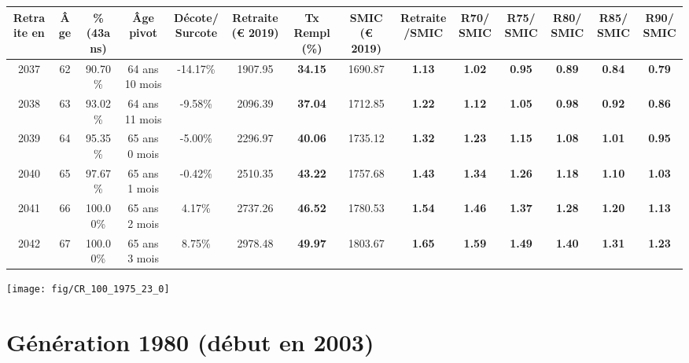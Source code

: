 \begin{adjustbox}{max width=\textwidth} 
\begin{tabular}[htb]{|c|c||c|c|c||c|c||c|c||c|c|c|c|c|} 
\hline 
 Retraite en &  Âge &  \%(43ans) &  Âge pivot &  Décote/Surcote &  Retraite (\euro{} 2019) &  Tx Rempl(\%) &  SMIC (\euro{} 2019) &  Retraite/SMIC &  R70/SMIC &  R75/SMIC &  R80/SMIC &  R85/SMIC &  R90/SMIC \\ 
\hline \hline 
 2037 &  62 &  90.70\% &  64 ans 10 mois &  -14.17\% &  1907.95 &  {\bf 34.15} &  1690.87 &  {\bf 1.13} &  {\bf 1.02} &  {\bf {\color{red} 0.95}} &  {\bf {\color{red} 0.89}} &  {\bf {\color{red} 0.84}} &  {\bf {\color{red} 0.79}} \\ 
\hline 
 2038 &  63 &  93.02\% &  64 ans 11 mois &  -9.58\% &  2096.39 &  {\bf 37.04} &  1712.85 &  {\bf 1.22} &  {\bf 1.12} &  {\bf 1.05} &  {\bf {\color{red} 0.98}} &  {\bf {\color{red} 0.92}} &  {\bf {\color{red} 0.86}} \\ 
\hline 
 2039 &  64 &  95.35\% &  65 ans 0 mois &  -5.00\% &  2296.97 &  {\bf 40.06} &  1735.12 &  {\bf 1.32} &  {\bf 1.23} &  {\bf 1.15} &  {\bf 1.08} &  {\bf 1.01} &  {\bf {\color{red} 0.95}} \\ 
\hline 
 2040 &  65 &  97.67\% &  65 ans 1 mois &  -0.42\% &  2510.35 &  {\bf 43.22} &  1757.68 &  {\bf 1.43} &  {\bf 1.34} &  {\bf 1.26} &  {\bf 1.18} &  {\bf 1.10} &  {\bf 1.03} \\ 
\hline 
 2041 &  66 &  100.00\% &  65 ans 2 mois &  4.17\% &  2737.26 &  {\bf 46.52} &  1780.53 &  {\bf 1.54} &  {\bf 1.46} &  {\bf 1.37} &  {\bf 1.28} &  {\bf 1.20} &  {\bf 1.13} \\ 
\hline 
 2042 &  67 &  100.00\% &  65 ans 3 mois &  8.75\% &  2978.48 &  {\bf 49.97} &  1803.67 &  {\bf 1.65} &  {\bf 1.59} &  {\bf 1.49} &  {\bf 1.40} &  {\bf 1.31} &  {\bf 1.23} \\ 
\hline 
\hline 
\end{tabular} 
\end{adjustbox} 
 
 \vspace{0.1cm} 

 {\hspace{-2.2cm}\texttt{[image: fig/CR\_100\_1975\_23\_0]}} 

\newpage 
 
\section{Génération 1980 (début en 2003)\label{CR_100_1980_23_0}} 
 
